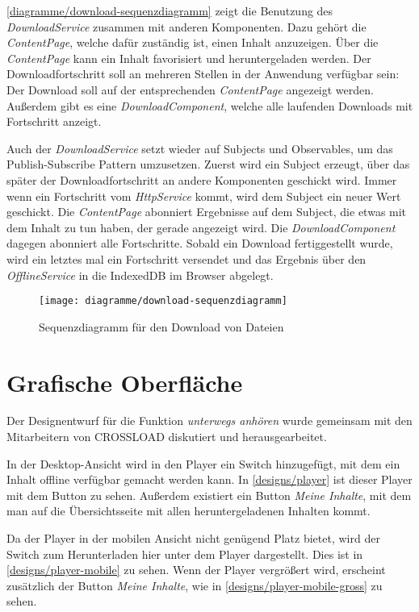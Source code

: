 \autoref{diagramme/download-sequenzdiagramm} zeigt die Benutzung des \textit{DownloadService} zusammen mit anderen Komponenten. Dazu gehört die \textit{ContentPage}, welche dafür zuständig ist, einen Inhalt anzuzeigen. Über die \textit{ContentPage} kann ein Inhalt favorisiert und heruntergeladen werden. Der Downloadfortschritt soll an mehreren Stellen in der Anwendung verfügbar sein: Der Download soll auf der entsprechenden \textit{ContentPage} angezeigt werden. Außerdem gibt es eine \textit{DownloadComponent}, welche alle laufenden Downloads mit Fortschritt anzeigt. 

Auch der \textit{DownloadService} setzt wieder auf Subjects und Observables, um das Publish-Subscribe Pattern umzusetzen. Zuerst wird ein Subject erzeugt, über das später der Downloadfortschritt an andere Komponenten geschickt wird. Immer wenn ein Fortschritt vom \textit{HttpService} kommt, wird dem Subject ein neuer Wert geschickt. Die \textit{ContentPage} abonniert Ergebnisse auf dem Subject, die etwas mit dem Inhalt zu tun haben, der gerade angezeigt wird. Die \textit{DownloadComponent} dagegen abonniert alle Fortschritte. Sobald ein Download fertiggestellt wurde, wird ein letztes mal ein Fortschritt versendet und das Ergebnis über den \textit{OfflineService} in die IndexedDB im Browser abgelegt.

\begin{sidewaysfigure}
 \texttt{[image: diagramme/download-sequenzdiagramm]}
  \caption{Sequenzdiagramm für den Download von Dateien}
  \label{diagramme/download-sequenzdiagramm}
\end{sidewaysfigure}

\section{Grafische Oberfläche}
Der Designentwurf für die Funktion \textit{unterwegs anhören} wurde gemeinsam mit den Mitarbeitern von CROSSLOAD diskutiert und herausgearbeitet. 

In der Desktop-Ansicht wird in den Player ein Switch hinzugefügt, mit dem ein Inhalt offline verfügbar gemacht werden kann. In \autoref{designs/player} ist dieser Player mit dem Button zu sehen. Außerdem existiert ein Button \textit{Meine Inhalte}, mit dem man auf die Übersichtsseite mit allen heruntergeladenen Inhalten kommt.


Da der Player in der mobilen Ansicht nicht genügend Platz bietet, wird der Switch zum Herunterladen hier unter dem Player dargestellt. Dies ist in \autoref{designs/player-mobile} zu sehen. Wenn der Player vergrößert wird, erscheint zusätzlich der Button \textit{Meine Inhalte}, wie in \autoref{designs/player-mobile-gross} zu sehen.

